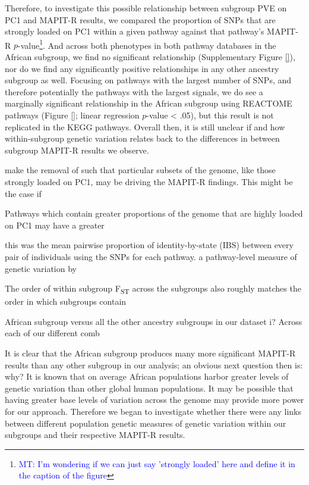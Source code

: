 \documentclass[12pt,a4paper]{article}
\begin{document}
Therefore, to investigate this possible relationship between subgroup PVE on PC1 and MAPIT-R results, we compared the proportion of SNPs that are strongly loaded on PC1 within a given pathway against that pathway's MAPIT-R $p$-value\footnote{\textcolor{blue}{MT: I'm wondering if we can just say 'strongly loaded' here and define it in the caption of the figure}}. And across both phenotypes in both pathway databases in the African subgroup, we find no significant relationship (Supplementary Figure \ref{}), nor do we find any significantly positive relationships in any other ancestry subgroup as well. Focusing on pathways with the largest number of SNPs, and therefore potentially the pathways with the largest signals, we do see a marginally significant relationship in the African subgroup using REACTOME pathways (Figure \ref{}; linear regression $p$-value < .05), but this result is not replicated in the KEGG pathways. Overall then, it is still unclear if and how within-subgroup genetic variation relates back to the differences in between subgroup MAPIT-R results we observe.















make the removal of  such that particular subsets of the genome, like those strongly loaded on PC1, may be driving the MAPIT-R findings. This might be the case if

Pathways which contain greater proportions of the genome that are highly loaded on PC1 may have a greater     

this was the mean pairwise proportion of identity-by-state (IBS) between every pair of individuals using the SNPs for each pathway. a pathway-level measure of genetic variation by 

The order of within subgroup F\textsubscript{ST} across the subgroups also roughly matches the order in which subgroups contain 

African subgroup versus all the other ancestry subgroups in our dataset i? Across each of our different comb





It is clear that the African subgroup produces many more significant MAPIT-R results than any other subgroup in our analysis; an obvious next question then is: why? It is known that on average African populations harbor greater levels of genetic variation than other global human populations. It may be possible that having greater base levels of variation across the genome may provide more power for our approach. Therefore we began to investigate whether there were any links between different population genetic measures of genetic variation within our subgroups and their respective MAPIT-R results.
\end{document}
